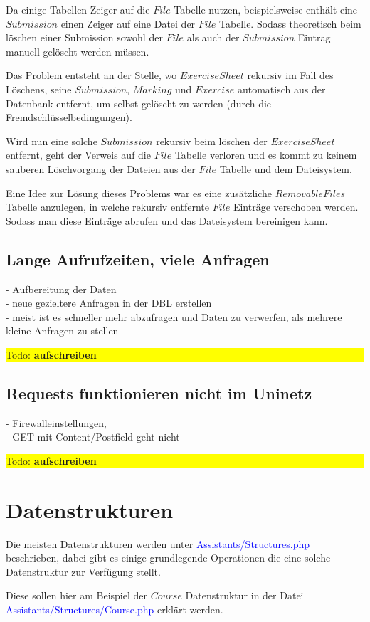 \documentclass[10pt,a4paper,final,parskip]{scrartcl}
\newcommand{\todo}[1]{\colorbox{yellow}{\parbox{\textwidth}{Todo: \textbf{#1}}}}
\begin{document}
Da einige Tabellen Zeiger auf die $File$ Tabelle nutzen, beispielsweise enthält eine $Submission$ einen Zeiger auf eine Datei der $File$ Tabelle. Sodass theoretisch beim löschen einer Submission sowohl der $File$ als auch der $Submission$ Eintrag manuell gelöscht werden müssen.

Das Problem entsteht an der Stelle, wo $ExerciseSheet$ rekursiv im Fall des Löschens, seine $Submission$, $Marking$ und $Exercise$ automatisch aus der Datenbank entfernt, um selbst gelöscht zu werden (durch die Fremdschlüsselbedingungen).

Wird nun eine solche $Submission$ rekursiv beim löschen der $ExerciseSheet$ entfernt, geht der Verweis auf die $File$ Tabelle verloren und es kommt zu keinem sauberen Löschvorgang der Dateien aus der $File$ Tabelle und dem Dateisystem.

Eine Idee zur Lösung dieses Problems war es eine zusätzliche $RemovableFiles$ Tabelle anzulegen, in welche rekursiv entfernte $File$ Einträge verschoben werden. Sodass man diese Einträge abrufen und das Dateisystem bereinigen kann.

\subsection{Lange Aufrufzeiten, viele Anfragen}
- Aufbereitung der Daten \\
- neue gezieltere Anfragen in der DBL erstellen \\
- meist ist es schneller mehr abzufragen und Daten zu verwerfen, als mehrere kleine Anfragen zu stellen\\
\todo{aufschreiben}

\subsection{Requests funktionieren nicht im Uninetz}
- Firewalleinstellungen, \\
- GET mit Content/Postfield geht nicht\\
\todo{aufschreiben}

\section{Datenstrukturen}
Die meisten Datenstrukturen werden unter
\textcolor{blue}{Assistants/Structures.php} beschrieben, dabei gibt es einige grundlegende Operationen die eine solche Datenstruktur zur Verfügung stellt.

Diese sollen hier am Beispiel der $Course$ Datenstruktur in der Datei \textcolor{blue}{Assistants/Structures/Course.php} erklärt werden.
\end{document}
